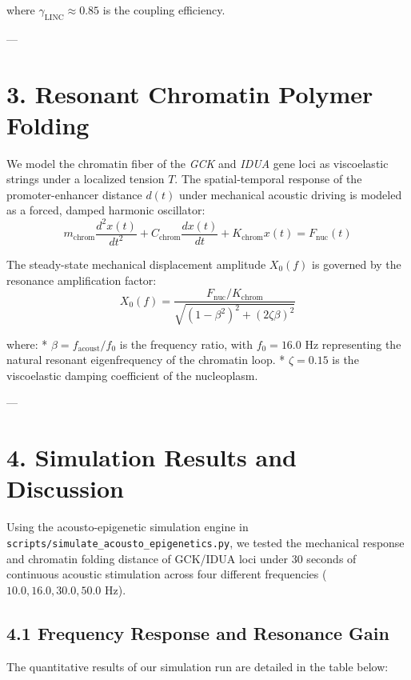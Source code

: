 \documentclass[11pt,twocolumn]{article}
\begin{document}
where $\gamma_{\text{LINC}} \approx 0.85$ is the coupling efficiency.

---

\section{3. Resonant Chromatin Polymer Folding}
We model the chromatin fiber of the \textit{GCK} and \textit{IDUA} gene loci as viscoelastic strings under a localized tension $T$. The spatial-temporal response of the promoter-enhancer distance $d(t)$ under mechanical acoustic driving is modeled as a forced, damped harmonic oscillator:
$$m_{\text{chrom}} \frac{d^2 x(t)}{dt^2} + C_{\text{chrom}} \frac{dx(t)}{dt} + K_{\text{chrom}} x(t) = F_{\text{nuc}}(t)$$

The steady-state mechanical displacement amplitude $X_0(f)$ is governed by the resonance amplification factor:
$$X_0(f) = \frac{F_{\text{nuc}} / K_{\text{chrom}}}{\sqrt{\left(1 - \beta^2\right)^2 + \left(2 \zeta \beta\right)^2}}$$

where:
*   $\beta = f_{\text{acoust}} / f_0$ is the frequency ratio, with $f_0 = 16.0\text{ Hz}$ representing the natural resonant eigenfrequency of the chromatin loop.
*   $\zeta = 0.15$ is the viscoelastic damping coefficient of the nucleoplasm.

---

\section{4. Simulation Results and Discussion}
Using the acousto-epigenetic simulation engine in \texttt{scripts/simulate_acousto_epigenetics.py}, we tested the mechanical response and chromatin folding distance of GCK/IDUA loci under 30 seconds of continuous acoustic stimulation across four different frequencies ($10.0, 16.0, 30.0, 50.0\text{ Hz}$).

\subsection{4.1 Frequency Response and Resonance Gain}
The quantitative results of our simulation run are detailed in the table below:
\end{document}
